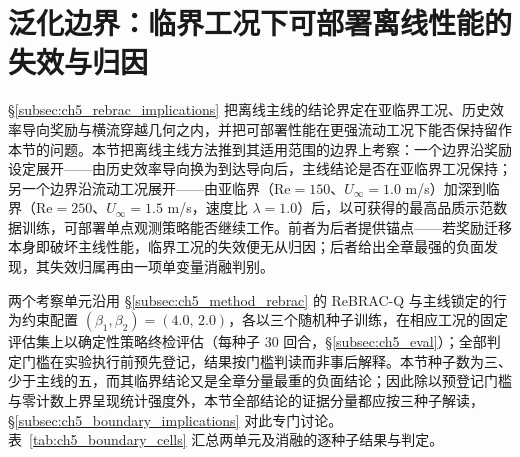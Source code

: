 
\section{泛化边界：临界工况下可部署离线性能的失效与归因}\label{sec:ch5_boundary}

\S\ref{subsec:ch5_rebrac_implications} 把离线主线的结论界定在亚临界工况、历史效率导向奖励与横流穿越几何之内，并把可部署性能在更强流动工况下能否保持留作本节的问题。本节把离线主线方法推到其适用范围的边界上考察：一个边界沿奖励设定展开——由历史效率导向换为到达导向后，主线结论是否在亚临界工况保持；另一个边界沿流动工况展开——由亚临界（$\mathrm{Re}=150$、$U_\infty=1.0$ m/s）加深到临界（$\mathrm{Re}=250$、$U_\infty=1.5$ m/s，速度比 $\lambda=1.0$）后，以可获得的最高品质示范数据训练，可部署单点观测策略能否继续工作。前者为后者提供锚点——若奖励迁移本身即破坏主线性能，临界工况的失效便无从归因；后者给出全章最强的负面发现，其失效归属再由一项单变量消融判别。

两个考察单元沿用 \S\ref{subsec:ch5_method_rebrac} 的 ReBRAC-Q 与主线锁定的行为约束配置 $(\beta_1,\beta_2)=(4.0,\,2.0)$，各以三个随机种子训练，在相应工况的固定评估集上以确定性策略终检评估（每种子 $30$ 回合，\S\ref{subsec:ch5_eval}）；全部判定门槛在实验执行前预先登记，结果按门槛判读而非事后解释。本节种子数为三、少于主线的五，而其临界结论又是全章分量最重的负面结论；因此除以预登记门槛与零计数上界呈现统计强度外，本节全部结论的证据分量都应按三种子解读，\S\ref{subsec:ch5_boundary_implications} 对此专门讨论。表~\ref{tab:ch5_boundary_cells} 汇总两单元及消融的逐种子结果与判定。


